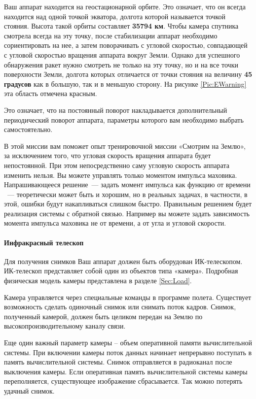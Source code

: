\documentclass[12pt,a4paper]{article}
\begin{document}
Ваш аппарат находится на геостационарной орбите. Это означает, что он всегда находится над
одной точкой экватора, долгота которой называется точкой стояния. Высота такой орбиты
составляет \textbf{35794 км}. Чтобы камера спутника смотрела всегда на эту точку, после
стабилизации аппарат необходимо сориентировать на нее, а затем поворачивать с угловой
скоростью, совпадающей с угловой скоростью вращения аппарата вокруг Земли. Однако для
успешного обнаружения ракет нужно смотреть не только на эту точку, но и на все точки
поверхности Земли, долгота которых отличается от точки стояния на величину \textbf{45
  градусов} как в большую, так и в меньшую сторону. На рисунке \ref{Pic:EWarning} эта область отмечена
красным.

Это означает, что на постоянный поворот накладывается дополнительный периодический поворот
аппарата, параметры которого вам необходимо выбрать самостоятельно.

В этой миссии вам поможет опыт тренировочной миссии «Смотрим на Землю», за исключением
того, что угловая скорость вращения аппарата будет непостоянной. При этом непосредственно
саму угловую скорость аппарата изменить нельзя. Вы можете управлять только моментом
импульса маховика. Напрашивающееся решение~--- задать момент импульса как функцию от времени
~--- теоретически может быть и хорошим, но в реальных задачах, в частности, в этой, ошибки
будут накапливаться слишком быстро. Правильным решением будет реализация системы с
обратной связью. Например вы можете задать зависимость момента импульса маховика не от
времени, а от угла и угловой скорости.

\paragraph{Инфракрасный телескоп}

Для получения снимков Ваш аппарат должен быть оборудован ИК-телескопом. ИК-телескоп
представляет собой один из объектов типа «камера». Подробная физическая модель камеры
представлена в разделе \ref{Sec:Load}.

Камера управляется через специальные команды в программе полета. Существует возможность
сделать одиночный снимок или снимать поток кадров. Снимок, полученный камерой,  должен
быть целиком передан на Землю по высокопроизводительному каналу связи.

Еще один важный параметр камеры – объем оперативной памяти вычислительной системы. При
включении камеры поток данных начинает непрерывно поступать в память вычислительной
системы. Снимок отправляется в радиоканал после выключения камеры. Если оперативная память
вычислительной системы камеры переполняется, существующее изображение сбрасывается. Так
можно потерять удачный снимок.
\end{document}
